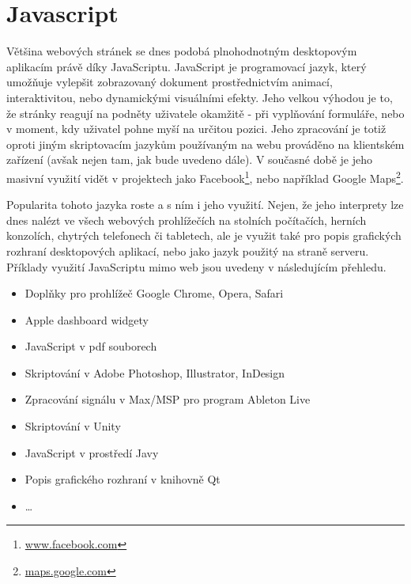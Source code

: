\pagebreak

\section{Javascript}
\label{section:javascript}
Většina webových stránek se dnes podobá plnohodnotným desktopovým aplikacím právě díky JavaScriptu. JavaScript je programovací jazyk, který umožňuje vylepšit zobrazovaný dokument prostřednictvím animací, interaktivitou, nebo dynamickými visuálními efekty. Jeho velkou výhodou je to, že stránky reagují na podněty uživatele okamžitě - při vyplňování formuláře, nebo v moment, kdy uživatel pohne myší na určitou pozici. Jeho zpracování je totiž oproti jiným skriptovacím jazykům používaným na webu prováděno na klientském zařízení (avšak nejen tam, jak bude uvedeno dále). V současné době je jeho masivní využití vidět v projektech jako Facebook\footnote{\url{www.facebook.com}}, nebo například Google Maps\footnote{\url{maps.google.com}}.

Popularita tohoto jazyka roste a s ním i jeho využití. Nejen, že jeho interprety lze dnes nalézt ve všech webových prohlížečích na stolních počítačích, herních konzolích, chytrých telefonech či tabletech, ale je využit také pro popis grafických rozhraní desktopových aplikací, nebo jako jazyk použitý na straně serveru. Příklady využití JavaScriptu mimo web jsou uvedeny v následujícím přehledu.

\begin{itemize}
\item Doplňky pro prohlížeč Google Chrome, Opera, Safari
\item Apple dashboard widgety
\item JavaScript v pdf souborech
\item Skriptování v Adobe Photoshop, Illustrator, InDesign
\item Zpracování signálu v Max/MSP pro program Ableton Live
\item Skriptování v Unity
\item JavaScript v prostředí Javy
\item Popis grafického rozhraní v knihovně Qt
\item \ldots
\end{itemize}

